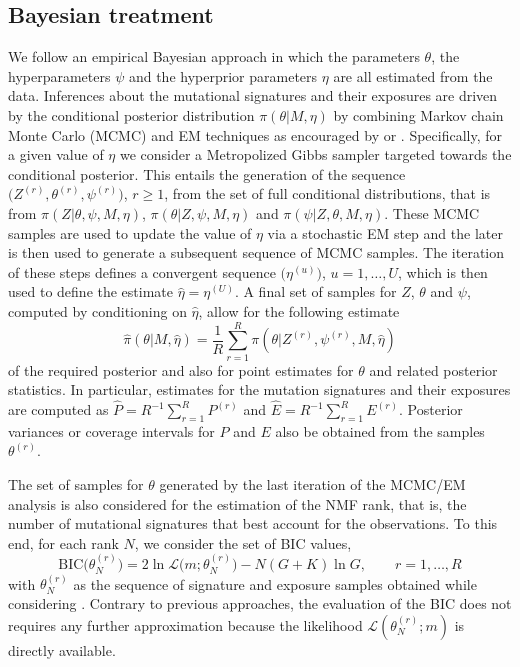 \documentclass{bioinfo}
\begin{document}
\subsection{Bayesian treatment}
We follow an empirical Bayesian approach in which the parameters
$\theta$, the hyperparameters $\psi$ and the hyperprior parameters
$\eta$ are all estimated from the data.  Inferences about the
mutational signatures and their exposures are driven by the
conditional posterior distribution $\pi(\theta|M, \eta)$ by combining
Markov chain Monte Carlo (MCMC) and EM techniques as
encouraged by \cite{C01} or \cite{LC}. Specifically, for a given value
of $\eta$ we consider a Metropolized Gibbs sampler targeted towards
the conditional posterior. This entails the generation of the sequence
$\big(Z^{(r)}, \theta^{(r)}, \psi^{(r)}\big)$, $r \geqslant 1$,
from the set of full conditional distributions, that is from $\pi(Z|
\theta, \psi, M, \eta)$, $\pi(\theta| Z, \psi, M, \eta)$ and
$\pi(\psi| Z, \theta, M, \eta)$. These MCMC samples are used to update
the value of $\eta$ via a stochastic EM step and the later is then
used to generate a subsequent sequence of MCMC samples. The iteration
of these steps defines a convergent sequence $\big(\eta^{(u)}\big)$,
$u = 1, \ldots, U$, which is then used to define the estimate
$\hat\eta = \eta^{(U)}$. A final set of samples for $Z$, $\theta$ and
$\psi$, computed by conditioning on $\hat\eta$, allow for the
following estimate
\begin{equation}
 \label{eqn:MCEM_estimate}
   \hat{\pi}(\theta|M, \hat\eta)
 = 
   \frac{1}{R}\sum_{r=1}^R \pi(\theta|Z^{(r)}, \psi^{(r)}, M,
   \hat\eta) 
\end{equation}
of the required posterior and also for point estimates for $\theta$
and related posterior statistics. In particular, estimates
for the mutation signatures and their exposures are computed as
$\widehat P = R^{-1}\sum_{r=1}^R P^{(r)}$ and $\widehat E =
R^{-1}\sum_{r=1}^R E^{(r)}$. Posterior variances or coverage intervals
for $P$ and $E$ also be obtained from the samples $\theta^{(r)}$. 

The set of samples for $\theta$ generated by the last iteration of
the MCMC/EM analysis is also considered for the estimation of the NMF
rank, that is, the number of mutational signatures that
best account for the observations. To this end, for each rank $N$, we
consider the set of BIC values, 
\[
  \text{BIC}\big(\theta^{(r)}_N\big) = 2\ln\mathcal L\big(m;
    \theta^{(r)}_{N}\big) - N(G+K)\ln G, \qquad r =1, \ldots,
    R
\]
with $\theta^{(r)}_N$ as the sequence of signature and exposure
samples obtained while considering . Contrary to previous approaches,
the evaluation of the BIC does not requires any further approximation
because the likelihood $\mathcal L(\theta^{(r)}_N; m)$ is directly 
available.
\end{document}

